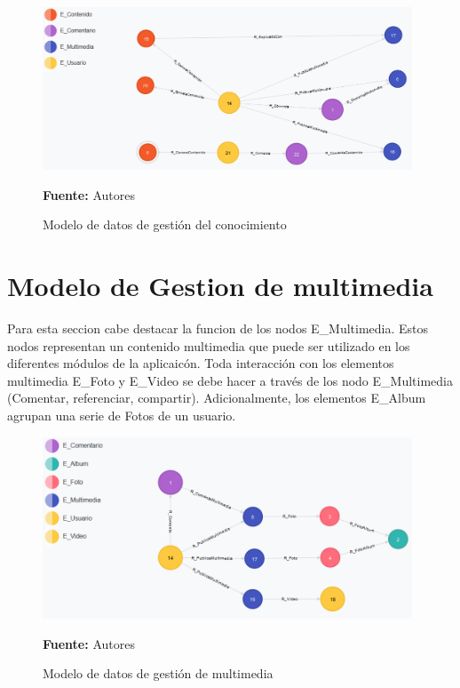 \begin{figure}[!htb]
  \begin{center}
    \includegraphics[width=11cm]{./imagenes/Modelo_de_datos/Contenidos.png}
    \caption{Modelo de datos de gestión del conocimiento}
    \label{fig:modelo_datos_gestion_conocimiento}
    \textbf{Fuente:}  Autores
  \end{center}
\end{figure}

\section{Modelo de Gestion de multimedia}

Para esta seccion cabe destacar la funcion de los nodos E\_Multimedia. Estos nodos representan un contenido multimedia que puede ser utilizado en los diferentes módulos de la aplicaicón. Toda interacción con los elementos multimedia E\_Foto y E\_Video se debe hacer a través de los nodo E\_Multimedia (Comentar, referenciar, compartir). Adicionalmente, los elementos E\_Album agrupan una serie de Fotos de un usuario.

\begin{figure}[!htb]
  \begin{center}
    \includegraphics[width=11cm]{./imagenes/Modelo_de_datos/Multimedia.png}
    \caption{Modelo de datos de gestión de multimedia}
    \label{fig:modelo_datos_gestion_multimedia}
    \textbf{Fuente:}  Autores
  \end{center}
\end{figure}

